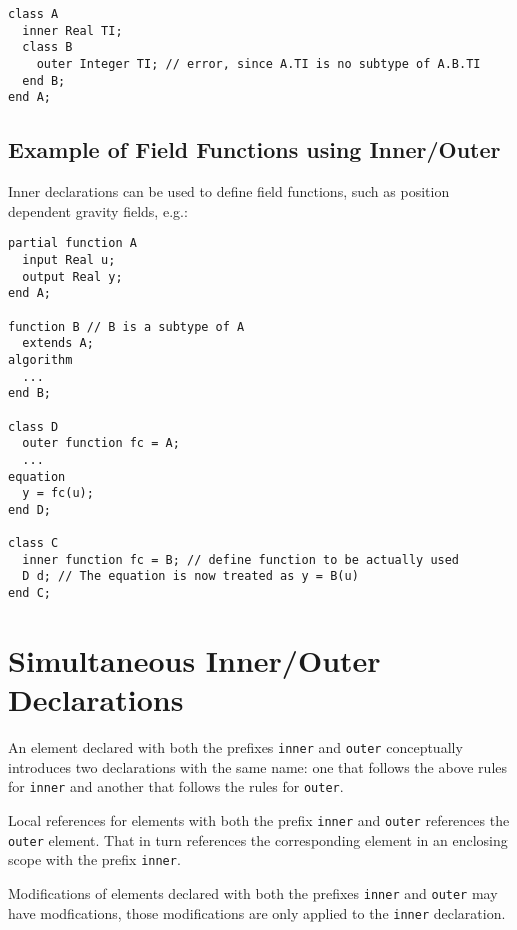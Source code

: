 \begin{example}
\begin{lstlisting}[language=modelica]
class A
  inner Real TI;
  class B
    outer Integer TI; // error, since A.TI is no subtype of A.B.TI
  end B;
end A;
\end{lstlisting}
\end{example}

\subsection{Example of Field Functions using Inner/Outer}\label{example-of-field-functions-using-inner-outer}

\begin{nonnormative}
Inner declarations can be used to define field functions, such
as position dependent gravity fields, e.g.:
\begin{lstlisting}[language=modelica]
partial function A
  input Real u;
  output Real y;
end A;

function B // B is a subtype of A
  extends A;
algorithm
  ...
end B;

class D
  outer function fc = A;
  ...
equation
  y = fc(u);
end D;

class C
  inner function fc = B; // define function to be actually used
  D d; // The equation is now treated as y = B(u)
end C;
\end{lstlisting}
\end{nonnormative}

\section{Simultaneous Inner/Outer Declarations}\label{simultaneous-inner-outer-declarations}

An element declared with both the prefixes \lstinline!inner! and \lstinline!outer! conceptually
introduces two declarations with the same name: one that follows the
above rules for \lstinline!inner! and another that follows the rules for \lstinline!outer!.

\begin{nonnormative}
Local references for elements with both the prefix \lstinline!inner! and \lstinline!outer! references the \lstinline!outer! element.  That in turn references the corresponding
element in an enclosing scope with the prefix \lstinline!inner!.
\end{nonnormative}

Modifications of elements declared with both the prefixes \lstinline!inner! and \lstinline!outer!
may have modfications, those modifications are only applied to the
\lstinline!inner! declaration.

